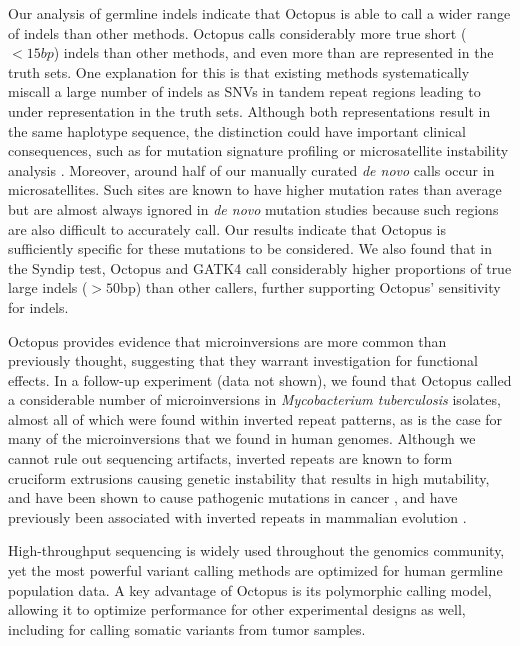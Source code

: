\documentclass[notitlepage, twocolumn, 10pt]{article}
\begin{document}
Our analysis of germline indels indicate that Octopus is able to call a wider range of indels than other methods. Octopus calls considerably more true short ($<15bp$) indels than other methods, and even more than are represented in the truth sets. One explanation for this is that existing methods systematically miscall a large number of indels as SNVs in tandem repeat regions leading to under representation in the truth sets. Although both representations result in the same haplotype sequence, the distinction could have important clinical consequences, such as for mutation signature profiling \cite{RN86} or microsatellite instability analysis \cite{RN331, RN454}. Moreover, around half of our manually curated \textit{de novo} calls occur in microsatellites. Such sites are known to have higher mutation rates than average but are almost always ignored in \textit{de novo} mutation studies because such regions are also difficult to accurately call. Our results indicate that Octopus is sufficiently specific for these mutations to be considered.
We also found that in the Syndip test, Octopus and GATK4 call considerably higher proportions of true large indels ($>50$bp) than other callers, further supporting Octopus' sensitivity for indels.

Octopus provides evidence that microinversions are more common than previously thought, suggesting that they warrant investigation for functional effects. In a follow-up experiment (data not shown), we found that Octopus called a considerable number of microinversions in \textit{Mycobacterium tuberculosis} isolates, almost all of which were found within inverted repeat patterns, as is the case for many of the microinversions that we found in human genomes. Although we cannot rule out sequencing artifacts, inverted repeats are known to form cruciform extrusions causing genetic instability that results in high mutability, and have been shown to cause pathogenic mutations in cancer \cite{RN615}, and have previously been associated with inverted repeats in mammalian evolution \cite{RN561, RN618}.

High-throughput sequencing is widely used throughout the genomics community, yet the most powerful variant calling methods are optimized for human germline population data. A key advantage of Octopus is its polymorphic calling model, allowing it to optimize performance for other experimental designs as well, including for calling somatic variants from tumor samples.
\end{document}
